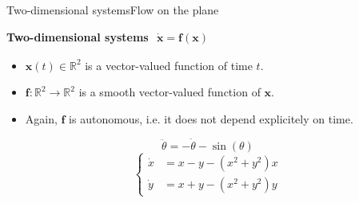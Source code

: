 \documentclass[usenames,dvipsnames,svgnames,10pt,aspectratio=169]{beamer}
\begin{document}
\begin{frame}[t, c]{Two-dimensional systems}{Flow on the plane}
  \begin{minipage}{.58\textwidth}
    \begin{block}{\centering \alert{\textbf{Two-dimensional systems}}}
      \centering
      \(
      \begin{aligned}
        \dot{\bm{x}} = \bm{f}(\bm{x})
      \end{aligned}
      \)
    \end{block}

    \bigskip

    \begin{itemize}
    \item $\bm{x}(t) \in \mathbb{R}^2$ is a vector-valued function of time $t$.

      \bigskip

    \item $\bm{f} : \mathbb{R}^2 \to \mathbb{R}^2$ is a smooth vector-valued function of $\bm{x}$.

      \bigskip

    \item Again, $\bm{f}$ is autonomous, i.e. it does not depend explicitely on time.
    \end{itemize}
  \end{minipage}%
  \hfill
  \begin{minipage}{.38\textwidth}
    \centering
    \[
    \ddot{\theta} = -\dot{\theta} - \sin(\theta)
    \]
    \[
    \left\{
    \begin{aligned}
      \dot{x} & = x - y - (x^2 + y^2)x \\
      \dot{y} & = x + y - (x^2 + y^2)y
    \end{aligned}
    \right.
    \]
  \end{minipage}

  \vspace{1cm}
\end{frame}
\end{document}
